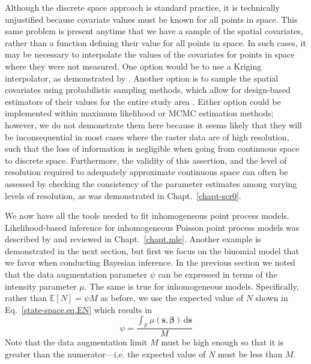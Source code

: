 Although the discrete space approach is standard practice, it is
technically unjustified because covariate values must be known for all
points in space. This same problem is present anytime that we have a
sample of the spatial covariates, rather than a function defining
their value for all points in space. In such cases, it may be necessary to
interpolate the values of the covariates for points in space where
they were not measured. One option would be to use a Kriging
interpolator, as demonstrated by \citet{rathbun:1996}. Another option
is to sample the spatial covariates using probabilistic sampling
methods, which allow for design-based estimators of their values for
the entire study area \citep{rathbun_etal:2007}. Either option could
be implemented within maximum likelihood or MCMC estimation methods;
however,
we do not demonstrate them here
because it seems likely that they will be inconsequential in most
cases where the raster data are of high resolution, such that the loss
of information is negligible when going from continuous space to
discrete space. Furthermore, the validity of this assertion, and the
level of resolution required to adequately approximate continuous
space can often be assessed by checking the consistency of the
parameter estimates among varying levels of resolution, as was
demonstrated in Chapt.~\ref{chapt-scr0}.

We now have all the tools needed to fit inhomogeneous point process
models. Likelihood-based inference for inhomogeneous Poisson point
process models was described by \citet{borchers_efford:2008} and
reviewed in Chapt.~\ref{chapt.mle}. Another example is demonstrated in
the next section, but first we focus on the binomial
model that we favor when conducting Bayesian inference. In the
previous section we noted that the data augmentation parameter $\psi$
can be expressed in terms of the intensity parameter $\mu$. The same
is true for inhomogeneous models. Specifically, rather than
$\mathbb{E}[N] = \psi M$ as before, we use the expected value of $N$ shown
in Eq.~\ref{state-space.eq.EN} which results in
\begin{equation}
\psi = \frac{\int_{\mathcal{S}} \mu(\mathbf{s},
  \bm{\beta}) \, \mathrm{d}\mathbf{s}}{M}
\label{state-space.eq.psimu}
\end{equation}
Note that the data augmentation limit $M$ must be high enough so that
it is greater than the numerator---i.e. the expected value
of $N$ must be less than $M$.

